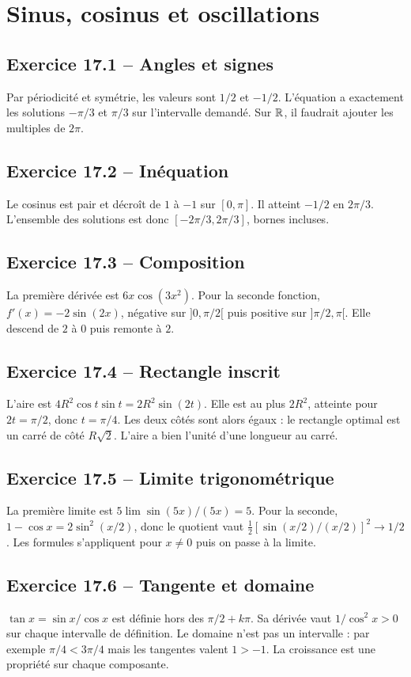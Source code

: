 \chapter{Sinus, cosinus et oscillations}
\section*{Exercice 17.1 -- Angles et signes}
Par périodicité et symétrie, les valeurs sont $1/2$ et $-1/2$. L'équation a exactement les solutions $-\pi/3$ et $\pi/3$ sur l'intervalle demandé. Sur $\mathbb{R}$, il faudrait ajouter les multiples de $2\pi$.

\section*{Exercice 17.2 -- Inéquation}
Le cosinus est pair et décroît de $1$ à $-1$ sur $[0,\pi]$. Il atteint $-1/2$ en $2\pi/3$. L'ensemble des solutions est donc $[-2\pi/3,2\pi/3]$, bornes incluses.

\section*{Exercice 17.3 -- Composition}
La première dérivée est $6x\cos(3x^2)$. Pour la seconde fonction, $f'(x)=-2\sin(2x)$, négative sur $]0,\pi/2[$ puis positive sur $]\pi/2,\pi[$. Elle descend de $2$ à $0$ puis remonte à $2$.

\section*{Exercice 17.4 -- Rectangle inscrit}
L'aire est $4R^2\cos t\sin t=2R^2\sin(2t)$. Elle est au plus $2R^2$, atteinte pour $2t=\pi/2$, donc $t=\pi/4$. Les deux côtés sont alors égaux : le rectangle optimal est un carré de côté $R\sqrt2$. L'aire a bien l'unité d'une longueur au carré.

\section*{Exercice 17.5 -- Limite trigonométrique}
La première limite est $5\lim\sin(5x)/(5x)=5$. Pour la seconde, $1-\cos x=2\sin^2(x/2)$, donc le quotient vaut $\frac12[\sin(x/2)/(x/2)]^2\to1/2$. Les formules s'appliquent pour $x\ne0$ puis on passe à la limite.

\section*{Exercice 17.6 -- Tangente et domaine}
$\tan x=\sin x/\cos x$ est définie hors des $\pi/2+k\pi$. Sa dérivée vaut $1/\cos^2x>0$ sur chaque intervalle de définition. Le domaine n'est pas un intervalle : par exemple $\pi/4<3\pi/4$ mais les tangentes valent $1>-1$. La croissance est une propriété sur chaque composante.
